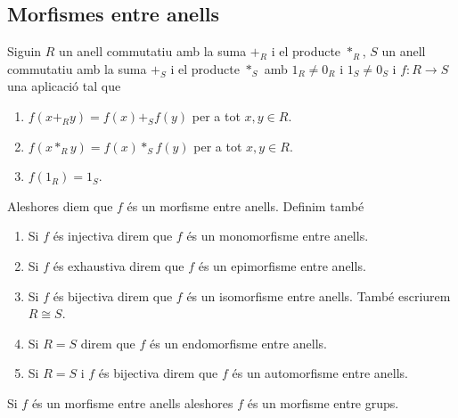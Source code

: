 \documentclass[../Apunts.tex]{subfiles}
\begin{document}
	\subsection{Morfismes entre anells}
	\begin{definition}
		\label{def:morfisme entre anells}
		\label{def:epimorfisme entre anells}
		\label{def:monomorfisme entre anells}
		\label{def:isomorfisme entre anells}
		\label{def:endomorfisme entre anells}
		Siguin \(R\) un anell commutatiu amb la suma \(+_{R}\) i el producte \(\ast_{R}\), \(S\) un anell commutatiu amb la suma \(+_{S}\) i el producte \(\ast_{S}\) amb \(1_{R}\neq0_{R}\) i \(1_{S}\neq0_{S}\) i \(f\colon R\longrightarrow S\) una aplicació tal que
		\begin{enumerate}
			\item \(f(x+_{R}y)=f(x)+_{S}f(y)\) per a tot \(x,y\in R\).
			\item \(f(x\ast_{R}y)=f(x)\ast_{S}f(y)\) per a tot \(x,y\in R\).
			\item \(f(1_{R})=1_{S}\).
		\end{enumerate}
		Aleshores diem que \(f\) és un morfisme entre anells. Definim també
		\begin{enumerate}
			\item Si \(f\) és injectiva direm que \(f\) és un monomorfisme entre anells.
			\item Si \(f\) és exhaustiva direm que \(f\) és un epimorfisme entre anells.
			\item Si \(f\) és bijectiva direm que \(f\) és un isomorfisme entre anells. També escriurem \(R\cong S\).
			\item Si \(R=S\) direm que \(f\) és un endomorfisme entre anells.
			\item Si \(R=S\) i \(f\) és bijectiva direm que \(f\) és un automorfisme entre anells.
		\end{enumerate}
	\end{definition}
	\begin{observation}
		\label{obs:morfisme entre anells és morfisme entre grups}
		Si \(f\) és un morfisme entre anells aleshores \(f\) és un morfisme entre grups.
	\end{observation}
\end{document}
